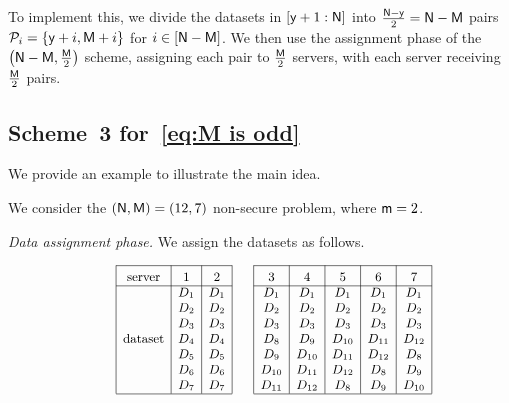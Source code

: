 \documentclass[conference,letterpaper]{IEEEtran}
\begin{document}
To implement this, we divide the datasets in \([{\sf y}+1 : {\sf N}]\) into \(\frac{{\sf N}-{\sf y}}{2} = {\sf N}-{\sf M}\) pairs \({\cal P}_i = \{{\sf y} + i, {\sf M} + i\}\) for \(i \in [{\sf N}-{\sf M}]\). We then use the assignment phase of the \(\bigl({\sf N}-{\sf M}, \tfrac{{\sf M}}{2}\bigr)\) scheme, assigning each pair to \(\tfrac{{\sf M}}{2}\) servers, with each server receiving \(\tfrac{{\sf M}}{2}\) pairs.



\subsection{\texorpdfstring{Scheme~3 for~\eqref{eq:M is odd}}{Scheme 3 for Eq. (Y)}}
\label{sub:M is odd}
We provide an example to illustrate the main idea.
\begin{example} \rm
\label{ex:scheme 3 example}
We consider the $({\sf N}, {\sf M}) = (12, 7)$ non-secure problem, where ${\sf m} = 2$.

{\it Data assignment phase.}
We assign the datasets as follows.  


\begin{align*}
{\small 
\begin{array}{rl|c|c|c|}\cline{3-3}\cline{4-4}\cline{5-5}
&&\rule{0pt}{1.2em}\mbox{server}&\rule{0pt}{1.2em}\mbox{\textnormal{1}}  &\rule{0pt}{1.2em}\mbox{\textnormal{2}} \\ \cline{3-3}\cline{4-4}\cline{5-5}
&& &D_1 & D_1 \\
&& &D_2 & D_2  \\
&& &D_3 & D_3 \\
&& \mbox{dataset}&D_4 & D_4  \\
&& &D_5 & D_5 \\
&& &D_6 & D_6 \\
&& &D_7 & D_7\\
\cline{3-3}\cline{4-4}\cline{5-5}
\end{array}
\hspace{-0.5em} %
\begin{array}{rl|c|c|c|c|c|}\cline{3-3}\cline{4-4}\cline{5-5}\cline{6-6}\cline{7-7}
&&\rule{0pt}{1.2em}\mbox{\textnormal{3}} & \rule{0pt}{1.2em}\mbox{\textnormal{4}} & \rule{0pt}{1.2em}\mbox{\textnormal{5}} & \rule{0pt}{1.2em}\mbox{\textnormal{6}} & \rule{0pt}{1.2em}\mbox{\textnormal{7}} \\ \cline{3-3}\cline{4-4}\cline{5-5}\cline{6-6}\cline{7-7}
&&  D_1 & D_1 & D_1 & D_1 & D_1\\
&&   D_2 & D_2 & D_2 & D_2 & D_2 \\
&&  D_3 & D_3 & D_3 & D_3 & D_3\\
&&  D_8 & D_9 & D_{10} & D_{11} & D_{12} \\
&&  D_9 & D_{10} & D_{11} & D_{12} & D_8\\
&&  D_{10} & D_{11} & D_{12} & D_8 & D_9\\
&&  D_{11} & D_{12} & D_8 & D_9 & D_{10}\\
\cline{3-3}\cline{4-4}\cline{5-5}\cline{6-6}\cline{7-7}
\end{array}
}
\end{align*}



\end{example}
\end{document}
